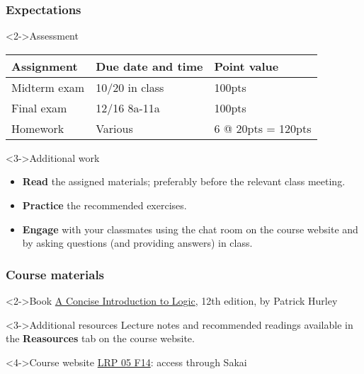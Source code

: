 \documentclass[10pt,letterpaper,xcolor=dvipsnames,handout]{beamer}
\begin{document}
\begin{frame}
\frametitle{Expectations}

\begin{block}<2->{Assessment}
  \begin{tabular}{lll}
   Assignment & Due date and time & Point value \\ \hline
   Midterm exam & 10/20 in class & 100pts \\
   Final exam & 12/16 8a-11a & 100pts \\
   Homework & Various & 6 @ 20pts = 120pts \\
  \end{tabular}
\end{block}  

\begin{block}<3->{Additional work}
  \begin{itemize}
    \item \textbf{Read} the assigned materials; preferably before the relevant class meeting.
    \item \textbf{Practice} the recommended exercises.
    \item \textbf{Engage} with your classmates using the chat room on the course website and by asking questions (and providing answers) in class.
  \end{itemize}
\end{block}

\end{frame}

\begin{frame}
\frametitle{Course materials}

\begin{block}<2->{Book}
  \href{http://bit.ly/1rw2moM}{A Concise Introduction to Logic}, 12th edition, by Patrick Hurley
\end{block}

\begin{block}<3->{Additional resources}
  Lecture notes and recommended readings available in the \textbf{Reasources} tab on the course website.
\end{block}

\begin{block}<4->{Course website}
\href{https://sakai.rutgers.edu/portal/site/34443d66-a245-4833-953e-1d238502ff28}{LRP 05 F14}: access through Sakai
\end{block}

\end{frame}
\end{document}
